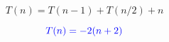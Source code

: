 \begin{frame}{}

  \vspace{0.30cm}
\end{frame}

\begin{frame}{}

  \begin{center}
    \href{https://math.stackexchange.com/a/475154/51434}{}
  \end{center}

  \pause
  \vspace{0.50cm}
  \[
    T(n) = T(n-1) + T(n/2) + n
  \]

  \pause
  \[
    \textcolor{blue}{T(n) = -2(n + 2)}
  \]
\end{frame}
